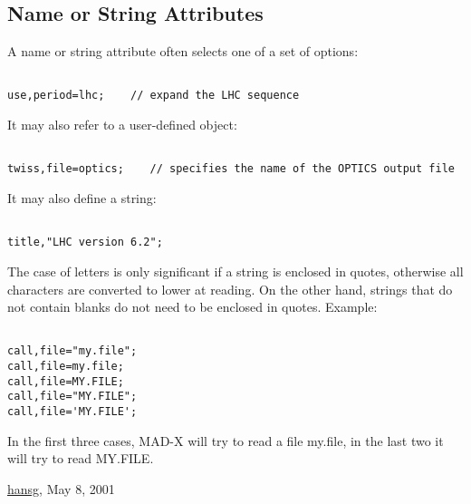 




\subsection{Name or String Attributes}
  A name or string attribute often selects one of a set of options: 
\begin{verbatim}

use,period=lhc;    // expand the LHC sequence
\end{verbatim} It may also refer to a user-defined object: 
\begin{verbatim}

twiss,file=optics;    // specifies the name of the OPTICS output file
\end{verbatim} It may also define a string: 
\begin{verbatim}

title,"LHC version 6.2";
\end{verbatim} The case of letters is only significant if a string is enclosed in quotes, otherwise all characters are converted to lower at reading. On the other hand, strings that do not contain blanks do not need to be enclosed in quotes. Example: 
\begin{verbatim}

call,file="my.file";
call,file=my.file;
call,file=MY.FILE;
call,file="MY.FILE";
call,file='MY.FILE';
\end{verbatim} In the first three cases, MAD-X will try to read a file my.file, in the last two it will try to read MY.FILE. 

\href{http://www.cern.ch/Hans.Grote/hansg_sign.html}{hansg}, May 8, 2001 

